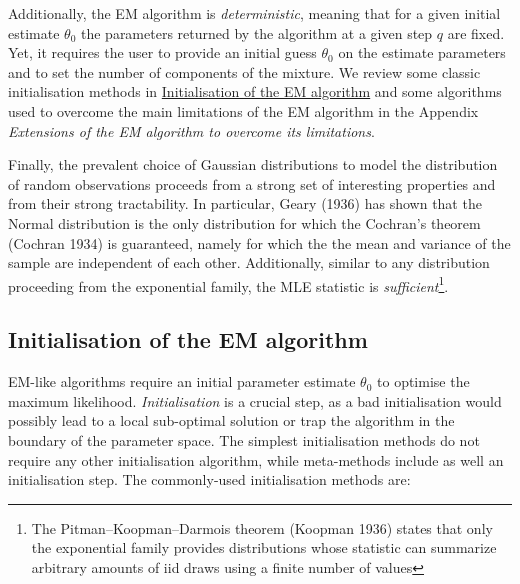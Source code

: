 Additionally, the EM algorithm is \emph{deterministic}, meaning that for a
given initial estimate \(\theta_0\) the parameters returned by the
algorithm at a given step \(q\) are fixed. Yet, it requires the user to
provide an initial guess \(\theta_0\) on the estimate parameters and to
set the number of components of the mixture. We review some classic
initialisation methods in \protect\hyperlink{initialisation-of-the-em-algorithm}{Initialisation of the EM algorithm} and some
algorithms used to overcome the main limitations of the EM
algorithm in the Appendix \emph{Extensions of the EM algorithm to overcome its limitations}.

Finally, the prevalent choice of Gaussian distributions to model the distribution of random observations proceeds from a strong set of interesting properties and from their strong tractability. In particular, Geary (1936) has shown that the Normal distribution is the only distribution for which the Cochran's theorem (Cochran 1934) is guaranteed, namely for which the the mean and variance of the sample are independent of each other. Additionally, similar to any distribution proceeding from the exponential family, the MLE statistic is \emph{sufficient}\footnote{The Pitman--Koopman--Darmois theorem (Koopman 1936) states that only the exponential family provides distributions whose statistic can summarize arbitrary amounts of iid draws using a finite number of values}.

\hypertarget{initialisation-of-the-em-algorithm}{%
\subsection{Initialisation of the EM algorithm}\label{initialisation-of-the-em-algorithm}}

EM-like algorithms require an initial parameter estimate \(\theta_0\) to
optimise the maximum likelihood. \emph{Initialisation} is a crucial step, as
a bad initialisation would possibly lead to a local sub-optimal solution
or trap the algorithm in the boundary of the parameter space. The
simplest initialisation methods do not require any other initialisation
algorithm, while meta-methods include as well an initialisation step.
The commonly-used initialisation methods are:

